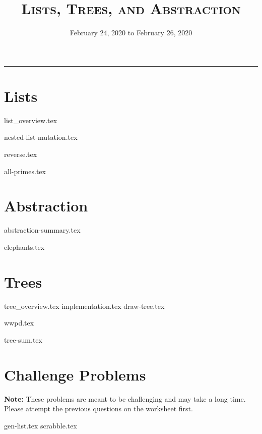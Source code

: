 \documentclass{exam}
\title{\textsc{Lists, Trees, and Abstraction}}
\date{February 24, 2020 to February 26, 2020}
\begin{document}
\maketitle
\rule{\textwidth}{0.15em}
\fontsize{12}{15}\selectfont


\section{Lists}
{list_overview.tex}
\begin{questions}
{nested-list-mutation.tex}

\begin{blocksection}
{reverse.tex}
\end{blocksection}

\begin{blocksection}
{all-primes.tex}
\end{blocksection}
\end{questions}

\newpage
\section{Abstraction}
{abstraction-summary.tex}
\begin{questions}
{elephants.tex}

\end{questions}

\newpage
\section{Trees}
{tree_overview.tex}
{implementation.tex}
{draw-tree.tex}
\begin{questions}
{wwpd.tex}

{tree-sum.tex}

\end{questions}

\newpage
\section{Challenge Problems}
\textbf{Note:} These problems are meant to be challenging and may take a long time. Please attempt the previous questions on the worksheet first.
\begin{questions}
{gen-list.tex}
\newpage
{scrabble.tex}
\end{questions}
\end{document}
